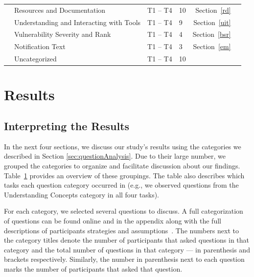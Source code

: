 \documentclass[10pt,journal,compsoc]{IEEEtran}
\begin{document}
\begin{table}
\begin{tabularx}{\textwidth}{|l|X|l|l|r|c|}
		& Resources and Documentation									& T1 -- T4 & 10     		& Section~\ref{rd}		\\
		
		
		
		& Understanding and Interacting with Tools						& T1 -- T4 & 9     		& Section~\ref{uit}			\\
		
		& Vulnerability Severity and Rank								& T1 -- T4 & 4     		& Section~\ref{bsr}		\\
		
		& Notification Text												& T1 -- T4 & 3     		& Section~\ref{em}		\\
		
		\hline	
		& Uncategorized													& T1 -- T4 & 10    		&			 \\
		\hline 
	\end{tabularx}
	\label{table:categories}
\end{table}



\section{Results}
\label{sec:results}
\subsection{Interpreting the Results}

In the next four sections, we discuss our study's results using the categories we described in Section \ref{sec:questionAnalysis}.
Due to their large number, we grouped the categories to organize and facilitate discussion about our findings. 
Table~\ref{table:categories} provides an overview of these groupings.
The table also describes which tasks each question category occurred in (e.g., we observed questions from the Understanding Concepts category in all four tasks).

For each category, we selected several questions to discuss. A full categorization of questions can be found online and in the appendix along with the full descriptions of participants strategies and assumptions~\cite{ExperimentalMaterials}.
The numbers next to the category titles denote the number of participants that asked questions in that category and the total number of questions in that category --- in parenthesis and brackets respectively. Similarly, the number in parenthesis next to each question marks the number of participants that asked that question.
\end{document}
